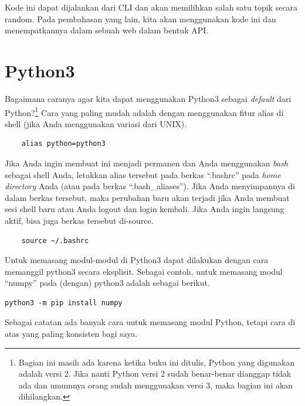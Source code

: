 Kode ini dapat dijalankan dari CLI dan akan memilihkan salah satu
topik secara random.
Pada pembahasan yang lain, kita akan menggunakan kode ini dan
menempatkannya dalam sebuah web dalam bentuk API.

\section{Python3}
Bagaimana caranya agar kita dapat menggunakan Python3 sebagai {\em default}
dari Python?\footnote{Bagian ini masih ada karena ketika buku ini ditulis,
Python yang digunakan adalah versi 2. Jika nanti Python versi 2 sudah
benar-benar dianggap tidak ada dan umumnya orang sudah menggunakan
versi 3, maka bagian ini akan dihilangkan.}
Cara yang paling mudah adalah dengan menggunakan fitur
alias di shell (jika Anda menggunakan variasi dari UNIX).

\begin{verbatim}
    alias python=python3
\end{verbatim}

Jika Anda ingin membuat ini menjadi permanen dan Anda menggunakan {\em bash}
sebagai shell Anda, letakkan alias tersebut pada berkas ``.bashrc'' pada
{\em home directory} Anda (atau pada berkas ``.bash\_aliases''). 
Jika Anda menyimpannya di dalam berkas tersebut, maka perubahan baru akan 
terjadi jika Anda membuat sesi shell baru atau Anda logout dan login kembali.
Jika Anda ingin langsung aktif, bisa juga berkas tersebut di-source.

\begin{verbatim}
    source ~/.bashrc
\end{verbatim}
    
Untuk memasang modul-modul di Python3 dapat dilakukan dengan cara
memanggil python3 secara eksplisit. Sebagai contoh, untuk memasang
modul ``numpy'' pada (dengan) python3 adalah sebagai berikut.

\begin{verbatim}
python3 -m pip install numpy
\end{verbatim}

Sebagai catatan ada banyak cara untuk memasang modul Python, tetapi
cara di atas yang paling konsisten bagi saya.
